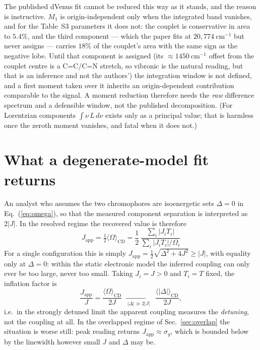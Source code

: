 \documentclass[11pt,a4paper]{article}
\begin{document}
The published dVenus fit cannot be reduced this way as it stands, and the
reason is instructive. $M_{1}$ is origin-independent only when the integrated
band vanishes, and for the Table~S3 parameters it does not: the couplet is
conservative in area to $5.4\%$, and the third component --- which the paper
fits at $20{,}774~\mathrm{cm^{-1}}$ but never assigns --- carries $18\%$ of the
couplet's area with the same sign as the negative lobe. Until that component is
assigned (its $\approx 1450~\mathrm{cm^{-1}}$ offset from the couplet centre is
a C=C/C=N stretch, so vibronic is the natural reading, but that is an inference
and not the authors') the integration window is not defined, and a first moment
taken over it inherits an origin-dependent contribution comparable to the
signal. A moment reduction therefore needs the \emph{raw} difference spectrum
and a defensible window, not the published decomposition. (For Lorentzian
components $\int\nu\,L\,d\nu$ exists only as a principal value; that is
harmless once the zeroth moment vanishes, and fatal when it does not.)

\section{What a degenerate-model fit returns}

An analyst who assumes the two chromophores are isoenergetic sets $\Delta=0$ in
Eq.~(\ref{eq:omega}), so that the measured component separation is interpreted
as $2|J|$. In the resolved regime the recovered value is therefore
\begin{equation}
\boxed{\;
J_{\mathrm{app}}=\tfrac{1}{2}\langle\Omega\rangle_{\mathrm{CD}}
=\frac{1}{2}\,\frac{\sum_{i} |J_{i}T_{i}|}{\sum_{i} |J_{i}T_{i}|/\Omega_{i}} \;}
\label{eq:japp}
\end{equation}
For a single configuration this is simply
$J_{\mathrm{app}}=\tfrac{1}{2}\sqrt{\Delta^{2}+4J^{2}}\ge |J|$, with equality
only at $\Delta=0$: within the static electronic model the inferred coupling
can only ever be too large, never too small. Taking $J_{i}=J>0$ and $T_{i}=T$
fixed, the inflation factor is
\begin{equation}
\frac{J_{\mathrm{app}}}{J}
=\frac{\langle\Omega\rangle_{\mathrm{CD}}}{2J}
\;\xrightarrow[\;|\Delta|\gg 2|J|\;]{}\;
\frac{\langle|\Delta|\rangle_{\mathrm{CD}}}{2J},
\end{equation}
i.e.\ in the strongly detuned limit the apparent coupling measures the
\emph{detuning}, not the coupling at all. In the overlapped regime of
Sec.~\ref{sec:overlap} the situation is worse still: peak reading returns
$J_{\mathrm{app}}\approx\sigma_g$, which is bounded below by the linewidth
however small $J$ and $\Delta$ may be.
\end{document}
